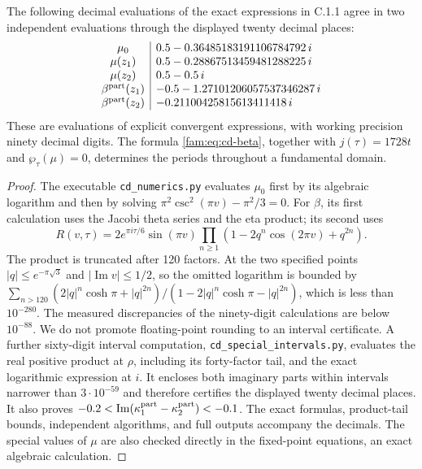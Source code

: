 \begin{proposition}\label{fam:src:C.1.2}\label{fam:st:C.1.2}
The following decimal evaluations of the exact expressions in C.1.1 agree
in two independent evaluations through the displayed twenty decimal places:
\[
\begin{array}{c|l}
\mu_0&0.5-0.36485183191106784792\,i\\
\mu(z_1)&0.5-0.28867513459481288225\,i\\
\mu(z_2)&0.5-0.5\,i\\
\beta^{\rm part}(z_1)&-0.5-1.27101206057537346287\,i\\
\beta^{\rm part}(z_2)&-0.21100425815613411418\,i
\end{array}
\]
These are evaluations of explicit convergent expressions, with working
precision ninety decimal digits. The formula \eqref{fam:eq:cd-beta}, together
with \(j(\tau)=1728t\) and \(\wp_\tau(\mu)=0\), determines the periods
throughout a fundamental domain.
\end{proposition}
\begin{proof}
The executable \texttt{cd\_numerics.py} evaluates \(\mu_0\) first by its
algebraic logarithm and then by solving
\(\pi^2\csc^2(\pi v)-\pi^2/3=0\). For \(\beta\), its first calculation uses
the Jacobi theta series and the eta product; its second uses
\[
 R(v,\tau)=2e^{\pi i\tau/6}\sin(\pi v)
 \prod_{n\geq1}(1-2q^n\cos(2\pi v)+q^{2n}).
\]
The product is truncated after 120 factors. At the two specified points
\(|q|\leq e^{-\pi\sqrt3}\) and \(|\operatorname{Im}v|\leq1/2\), so the
omitted logarithm is bounded by
\(\sum_{n>120}(2|q|^n\cosh\pi+|q|^{2n})/(1-2|q|^n\cosh\pi-|q|^{2n})\),
which is less than \(10^{-280}\). The measured discrepancies of the
ninety-digit calculations are below \(10^{-88}\). We do not promote floating-point rounding to an interval certificate.
A further sixty-digit interval computation, \texttt{cd\_special\_intervals.py},
evaluates the real positive product at $\rho$, including its forty-factor
tail, and the exact logarithmic expression at $i$. It encloses both
imaginary parts within intervals narrower than $3\cdot10^{-59}$ and
therefore certifies the displayed twenty decimal places. It also proves
$-0.2<\operatorname{Im}(\kappa_1^{\rm part}-\kappa_2^{\rm part})<-0.1$.
The exact formulas, product-tail bounds, independent algorithms, and
full outputs accompany the decimals. The special values of \(\mu\) are also checked directly in
the fixed-point equations, an exact algebraic calculation.
\end{proof}

